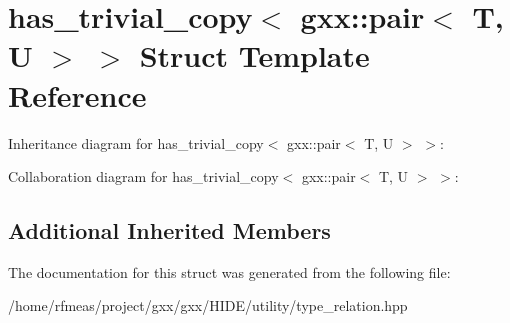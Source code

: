 \hypertarget{structhas__trivial__copy_3_01gxx_1_1pair_3_01T_00_01U_01_4_01_4}{}\section{has\+\_\+trivial\+\_\+copy$<$ gxx\+:\+:pair$<$ T, U $>$ $>$ Struct Template Reference}
\label{structhas__trivial__copy_3_01gxx_1_1pair_3_01T_00_01U_01_4_01_4}


Inheritance diagram for has\+\_\+trivial\+\_\+copy$<$ gxx\+:\+:pair$<$ T, U $>$ $>$\+:


Collaboration diagram for has\+\_\+trivial\+\_\+copy$<$ gxx\+:\+:pair$<$ T, U $>$ $>$\+:
\subsection*{Additional Inherited Members}


The documentation for this struct was generated from the following file\+:\begin{DoxyCompactItemize}
\item 
/home/rfmeas/project/gxx/gxx/\+H\+I\+D\+E/utility/type\+\_\+relation.\+hpp\end{DoxyCompactItemize}
